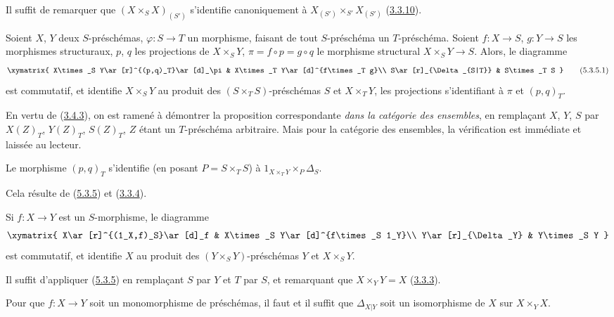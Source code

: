 Il suffit de remarquer que $(X\times_S X)_{(S')}$ s'identifie canoniquement à
$X_{(S')}\times_{S'}X_{(S')}$
(\hyperref[I.3.3.10-fr]{3.3.10}).

\begin{proposition}[5.3.5]
\label{I.5.3.5-fr}
Soient $X$, $Y$ deux $S$-préschémas, $\varphi:S\to T$ un morphisme, faisant de
tout $S$-préschéma un $T$-préschéma. Soient $f:X\to S$, $g:Y\to S$ les
morphismes structuraux, $p$, $q$ les projections de $X\times_S Y$,
$\pi=f\circ p=g\circ q$ le morphisme structural $X\times_S Y\to S$. Alors, le
diagramme
\[
  \xymatrix{
    X\times_S Y\ar[r]^{(p,q)_T}\ar[d]_\pi &
    X\times_T Y\ar[d]^{f\times_T g}\\
    S\ar[r]_{\Delta_{S|T}} &
    S\times_T S
  }
  \tag{5.3.5.1}\label{I.5.3.5.1-fr}
\]
est commutatif, et identifie $X\times_S Y$ au produit des
$(S\times_T S)$-préschémas $S$ et $X\times_T Y$, les projections
s'identifiant à $\pi$ et $(p,q)_T$.
\end{proposition}

En vertu de (\hyperref[I.3.4.3-fr]{3.4.3}), on est ramené à démontrer la
proposition correspondante \emph{dans la catégorie des ensembles}, en
remplaçant $X$, $Y$, $S$ par $X(Z)_T$, $Y(Z)_T$, $S(Z)_T$, $Z$ étant un
$T$-préschéma arbitraire. Mais pour la catégorie des ensembles, la vérification
est immédiate et laissée au lecteur.

\begin{corollary}[5.3.6]
\label{I.5.3.6-fr}
Le morphisme $(p,q)_T$ s'identifie (en posant $P=S\times_T S$) à
$1_{X\times_T Y}\times_P\Delta_S$.
\end{corollary}

Cela résulte de (\hyperref[I.5.3.5-fr]{5.3.5}) et
(\hyperref[I.3.3.4-fr]{3.3.4}).

\begin{corollary}[5.3.7]
\label{I.5.3.7-fr}
Si $f:X\to Y$ est un $S$-morphisme, le diagramme
\[
  \xymatrix{
    X\ar[r]^{(1_X,f)_S}\ar[d]_f &
    X\times_S Y\ar[d]^{f\times_S 1_Y}\\
    Y\ar[r]_{\Delta_Y} &
    Y\times_S Y
  }
\]
est commutatif, et identifie $X$ au produit des
$(Y\times_S Y)$-préschémas $Y$ et $X\times_S Y$.
\end{corollary}

Il suffit d'appliquer (\hyperref[I.5.3.5-fr]{5.3.5}) en remplaçant $S$ par
$Y$ et $T$ par $S$, et remarquant que $X\times_Y Y=X$
(\hyperref[I.3.3.3-fr]{3.3.3}).

\begin{proposition}[5.3.8]
\label{I.5.3.8-fr}
Pour que $f:X\to Y$ soit un monomorphisme de préschémas, il faut et il suffit
que $\Delta_{X|Y}$ soit un isomorphisme de $X$ sur $X\times_Y X$.
\end{proposition}

